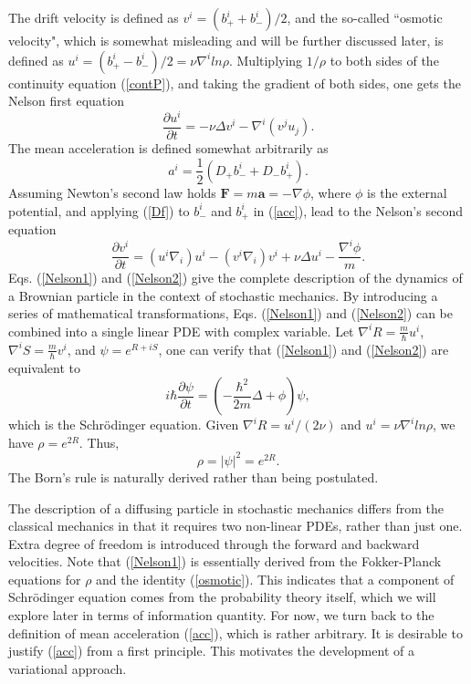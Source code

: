 \documentclass[%
 aip, 
 amsmath,amssymb,amsthm,
 nofootinbib,
 reprint,
]{revtex4-1}
\begin{document}
The drift velocity is defined as $v^i=(b_+^i + b_-^i)/2$, and the so-called ``osmotic velocity", which is somewhat misleading and will be further discussed later, is defined as $u^i=(b_+^i - b_-^i)/2 = \nu\nabla^i ln\rho$. Multiplying $1/\rho$ to both sides of the continuity equation (\ref{contP}), and taking the gradient of both sides, one gets the Nelson first equation
\begin{equation}
    \label{Nelson1}
    \frac{\partial u^i}{\partial t} = -\nu\Delta v^i - \nabla^i (v^ju_j).
\end{equation}
The mean acceleration is defined somewhat arbitrarily as
\begin{equation}
    \label{acc}
    a^i = \frac{1}{2}(D_+b_-^i + D_-b_+^i).
\end{equation}
Assuming Newton's second law holds $\mathbf{F} = m\mathbf{a} = -\nabla\phi$, where $\phi$ is the external potential, and applying (\ref{Df}) to $b_-^i$ and $b_+^i$ in (\ref{acc}), lead to the Nelson's second equation
\begin{equation}
    \label{Nelson2}
    \frac{\partial v^i}{\partial t} = (u^i\nabla_i)u^i-(v^i\nabla_i)v^i+\nu\Delta u^i - \frac{\nabla^i\phi}{m}.
\end{equation}
Eqs. (\ref{Nelson1}) and (\ref{Nelson2}) give the complete description of the dynamics of a Brownian particle in the context of stochastic mechanics. By introducing a series of mathematical transformations, Eqs. (\ref{Nelson1}) and (\ref{Nelson2}) can be combined into a single linear PDE with complex variable. Let $\nabla^iR=\frac{m}{\hbar}u^i$, $\nabla^i S=\frac{m}{\hbar}v^i$, and $\psi=e^{R+iS}$, one can verify that (\ref{Nelson1}) and (\ref{Nelson2}) are equivalent to
\begin{equation}
    \label{SE}
    i\hbar\frac{\partial \psi}{\partial t} = (-\frac{\hbar^2}{2m}\Delta + \phi)\psi,
\end{equation}
which is the Schr\"{o}dinger equation. Given $\nabla^iR=u^i/(2\nu)$ and $u^i = \nu\nabla^i ln\rho$, we have $\rho = e^{2R}$. Thus,
\begin{equation}
    \label{Born}
    \rho = |\psi|^2 = e^{2R}.
\end{equation}
The Born's rule is naturally derived rather than being postulated. 

The description of a diffusing particle in stochastic mechanics differs from the classical mechanics in that it requires two non-linear PDEs, rather than just one. Extra degree of freedom is introduced through the forward and backward velocities. Note that (\ref{Nelson1}) is essentially derived from the Fokker-Planck equations for $\rho$ and the identity (\ref{osmotic}). This indicates that a component of Schr\"{o}dinger equation comes from the probability theory itself, which we will explore later in terms of information quantity. For now, we turn back to the definition of mean acceleration (\ref{acc}), which is rather arbitrary. It is desirable to justify (\ref{acc}) from a first principle. This motivates the development of a variational approach. 
\end{document}
